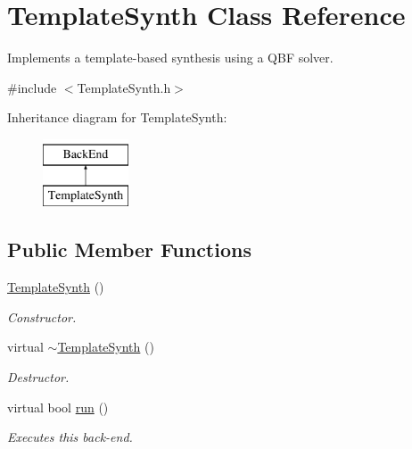\hypertarget{classTemplateSynth}{\section{Template\-Synth Class Reference}
\label{classTemplateSynth}
}


Implements a template-\/based synthesis using a Q\-B\-F solver.  




{\ttfamily \#include $<$Template\-Synth.\-h$>$}

Inheritance diagram for Template\-Synth\-:\begin{figure}[H]
\begin{center}
\leavevmode
\includegraphics[height=2.000000cm]{classTemplateSynth}
\end{center}
\end{figure}
\subsection*{Public Member Functions}
\begin{DoxyCompactItemize}
\item 
\hyperlink{classTemplateSynth_a157066a0bba6b543ac9cc6ff3a4223d7}{Template\-Synth} ()
\begin{DoxyCompactList}\small\item\em Constructor. \end{DoxyCompactList}\item 
virtual \hyperlink{classTemplateSynth_a5d540c9d4dc6696b53768a27ac74c569}{$\sim$\-Template\-Synth} ()
\begin{DoxyCompactList}\small\item\em Destructor. \end{DoxyCompactList}\item 
virtual bool \hyperlink{classTemplateSynth_a5ad9855736c7d4dfdec08280d2424f80}{run} ()
\begin{DoxyCompactList}\small\item\em Executes this back-\/end. \end{DoxyCompactList}\end{DoxyCompactItemize}
